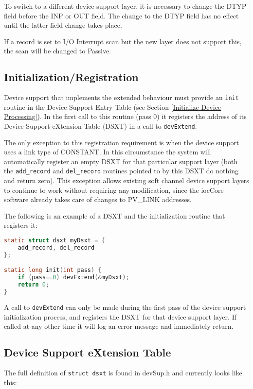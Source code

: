 To switch to a different device support layer, it is necessary to change the DTYP field before the INP or OUT field.
The change to the DTYP field has no effect until the latter field change takes place.

If a record is set to I/O Interrupt scan but the new layer does not support this, the scan will be changed to Passive.

\subsection{Initialization/Registration}

Device support that implements the extended behaviour must provide an \verb|init| routine in the Device Support Entry Table 
(see Section \ref{Initialize Device Processing}).
In the first call to this routine (pass 0) it registers the address of its Device Support eXtension Table (DSXT) in a call to \verb|devExtend|.

The only exception to this registration requirement is when the device support uses a link type of CONSTANT.  In this 
circumstance the system will automatically register an empty DSXT for that particular support layer (both the 
\verb|add_record| and \verb|del_record| routines pointed to by this DSXT do nothing and return zero). This exception allows 
existing soft channel device support layers to continue to work without requiring any modification, since the iocCore 
software already takes care of changes to PV\_LINK addresses.

The following is an example of a DSXT and the initialization routine that registers it:

\begin{lstlisting}[language=C]
static struct dsxt myDsxt = {
    add_record, del_record
};

static long init(int pass) {
    if (pass==0) devExtend(&myDsxt);
    return 0;
}
\end{lstlisting}

A call to \verb|devExtend| can only be made during the first pass of the device support initialization process, and registers the DSXT for that device support layer.
If called at any other time it will log an error message and immediately return.

\subsection{Device Support eXtension Table}

The full definition of \verb|struct dsxt| is found in devSup.h and currently looks like this:

